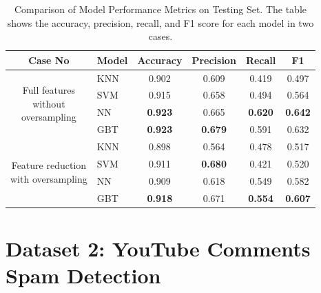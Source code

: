 \documentclass[conference]{IEEEtran}
\begin{document}
\begin{table}[h]
    \centering
    \begin{tabular}{|c|l|c|c|c|c|}
    \hline
    Case No & Model & Accuracy & Precision & Recall & F1 \\
    \hline
    \multirow{4}{*}{\parbox{2cm}{Full features \\ without \\ oversampling}} 
    & KNN & 0.902 & 0.609 & 0.419 & 0.497 \\
    & SVM & 0.915 & 0.658 & 0.494 & 0.564 \\
    & NN & \textbf{0.923} & 0.665 & \textbf{0.620} & \textbf{0.642} \\
    & GBT & \textbf{0.923} & \textbf{0.679} & 0.591 & 0.632 \\
    \hline
    \multirow{4}{*}{\parbox{2cm}{Feature reduction \\ with oversampling}}
    & KNN & 0.898 & 0.564 & 0.478 & 0.517 \\
    & SVM & 0.911 & \textbf{0.680} & 0.421 & 0.520 \\
    & NN & 0.909 & 0.618 & 0.549 & 0.582 \\
    & GBT & \textbf{0.918} & 0.671 & \textbf{0.554} & \textbf{0.607} \\
    \hline
    \end{tabular}
    \caption{Comparison of Model Performance Metrics on Testing Set. The table shows the accuracy, precision, recall, and F1 score for each model in two cases.}
    \label{tab:model-performance-dataset1}
\end{table}

\section{Dataset 2: YouTube Comments Spam Detection \label{sec:youtube}}
\end{document}
